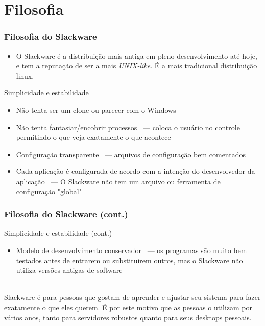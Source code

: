 \documentclass{beamer}
\begin{document}
\section{Filosofia}
\begin{frame}
	\frametitle{Filosofia do Slackware}
		\begin{itemize}
			\item O Slackware é a distribuição mais antiga em pleno
				desenvolvimento até hoje, e tem a reputação de ser a mais
				\textit{UNIX-like}. É a mais tradicional distribuição
				linux.
		\end{itemize}
		\begin{block}{Simplicidade e estabilidade}
			\begin{itemize}
				\item Não tenta ser um clone ou parecer com o Windows
				\item Não tenta fantasiar/encobrir processos ~--- coloca o usuário
					no controle permitindo-o que veja exatamente o que acontece
				\item Configuração transparente ~--- arquivos de configuração bem
					comentados
				\item Cada aplicação é configurada de acordo com a intenção do
					desenvolvedor da aplicação ~--- O Slackware não tem um arquivo
					ou ferramenta de configuração "global"
			\end{itemize}
		\end{block}
\end{frame}
\begin{frame}
	\frametitle{Filosofia do Slackware (cont.)}
		\begin{block}{Simplicidade e estabilidade (cont.)}
			\begin{itemize}
				\item Modelo de desenvolvimento conservador ~--- os programas são
					muito bem testados antes de entrarem ou substituirem outros,
					mas o Slackware não utiliza versões antigas de software
			\end{itemize}
		\end{block}
		~\\
		Slackware é para pessoas que gostam de aprender e ajustar seu sistema
		para fazer exatamente o que eles querem. É por este motivo que as
		pessoas o utilizam por vários anos, tanto para servidores robustos
		quanto para seus desktops pessoais.
\end{frame}
\end{document}
